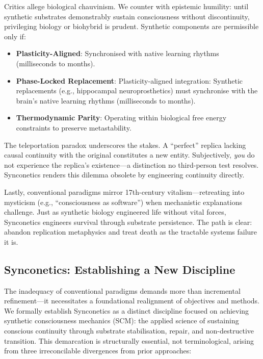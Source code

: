 \documentclass[10pt]{article}
\begin{document}
\begin{sloppypar}
  Critics allege biological chauvinism. We counter with epistemic humility: until synthetic substrates demonstrably sustain consciousness without discontinuity, privileging biology or biohybrid is prudent. Synthetic components are permissible only if:

  \begin{itemize}
    \item \textbf{Plasticity-Aligned}: Synchronised with native learning rhythms (milliseconds to months).
    \item \textbf{Phase-Locked Replacement}: Plasticity-aligned integration: Synthetic replacements (e.g., hippocampal neuroprosthetics) must synchronise with the brain’s native learning rhythms (milliseconds to months).
    \item \textbf{Thermodynamic Parity}: Operating within biological free energy constraints to preserve metastability.
  \end{itemize}

  The teleportation paradox underscores the stakes. A “perfect” replica lacking causal continuity with the original constitutes a new entity. Subjectively, \textit{you} do not experience the replica’s existence—a distinction no third-person test resolves. Synconetics renders this dilemma obsolete by engineering continuity directly.

  Lastly, conventional paradigms mirror 17th-century vitalism—retreating into mysticism (e.g., “consciousness as software”) when mechanistic explanations challenge. Just as synthetic biology engineered life without vital forces, Synconetics engineers survival through substrate persistence. The path is clear: abandon replication metaphysics and treat death as the tractable systems failure it is.

  \subsection{Synconetics: Establishing a New Discipline}
  \label{sec:new-discipline}

  The inadequacy of conventional paradigms demands more than incremental refinement—it necessitates a foundational realignment of objectives and methods. We formally establish Synconetics as a distinct discipline focused on achieving synthetic consciousness mechanics (SCM): the applied science of sustaining conscious continuity through substrate stabilisation, repair, and non-destructive transition. This demarcation is structurally essential, not terminological, arising from three irreconcilable divergences from prior approaches:


\end{sloppypar}
\end{document}
